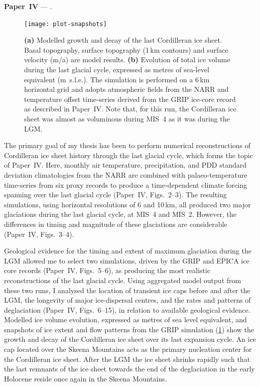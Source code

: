 \documentclass[a4paper]{kappa}
\newcommand{\CCYC}[0]{Paper~IV}     %
\begin{document}
\noindent\textbf{\CCYC} --- .
\bigskip

\begin{figure}
  \texttt{[image: plot-snapshots]}
  \caption{\textbf{(a)} Modelled growth and decay of the last Cordilleran ice
           sheet. Basal topography, surface topography (1\,km contours) and
           surface velocity (m/a) are model results.
           \textbf{(b)} Evolution of total ice volume during the last glacial
           cycle, expressed as metres of sea-level equivalent (m~s.l.e.). The
           simulation is performed on a 6\,km horizontal grid and adopts
           atmospheric fields from the NARR \citep{Mesinger.etal.2006} and
           temperature offset time-series derived from the GRIP ice-core record
           \citep{Dansgaard.etal.1993} as described in \CCYC. Note that, for
           this run, the Cordilleran ice sheet was almost as voluminous during
           MIS~4 as it was during the LGM.}
  \label{fig:plot-snapshots}
\end{figure}

The primary goal of my thesis has been to perform numerical reconstructions
of Cordilleran ice sheet history through the last glacial cycle, which forms
the topic of \CCYC.
Here, monthly air temperature, precipitation, and PDD standard deviation
climatologies from the NARR are combined with palaeo-temperature time-series
from six proxy records to produce a time-dependent climate forcing
spanning over the last glacial cycle (\CCYC,
Figs.~2--3). The resulting simulations, using horizontal resolutions of 6 and
10\,km, all produced two major glaciations during the last glacial cycle, at
MIS~4 and MIS~2. However, the differences in timing and magnitude of these
glaciations are considerable (\CCYC, Figs.~3--4).

Geological evidence for the timing and extent of maximum glaciation during the
LGM allowed me to select two simulations, driven by the GRIP
\citep{Dansgaard.etal.1993} and EPICA \citep{Jouzel.etal.2007} ice core records
(\CCYC, Figs.~5--6), as producing the most realistic reconstructions of the
last glacial cycle. Using aggregated model output from these two runs, I
analysed the location of transient ice caps before and after the LGM, the
longevity of major ice-dispersal centres, and the rates and patterns of
deglaciation (\CCYC, Figs.~6--15), in relation to available geological
evidence. Modelled ice volume evolution, expressed as metres of sea level
equivalent, and snapshots of ice extent and flow patterns from the GRIP
simulation (\cref{fig:plot-snapshots}) show the growth and decay of the
Cordilleran ice sheet over its last expansion cycle. An ice cap located over
the Skeena Mountains acts as the primary nucleation center for the Cordilleran
ice sheet. After the LGM the ice sheet shrinks rapidly such that the last
remnants of the ice sheet towards the end of the deglaciation in the early
Holocene reside once again in the Skeena Mountains.
\end{document}
